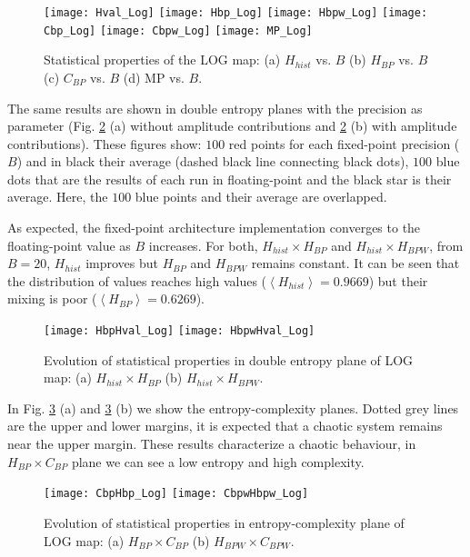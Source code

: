 \begin{figure}
	\texttt{[image: Hval\_Log]}
	\texttt{[image: Hbp\_Log]}
	\texttt{[image: Hbpw\_Log]}
	\texttt{[image: Cbp\_Log]}
	\texttt{[image: Cbpw\_Log]}
	\texttt{[image: MP\_Log]}
	\caption{Statistical properties of the LOG map: (a) $H_{hist}$ vs. $B$ (b) $H_{BP}$ vs. $B$ (c) $C_{BP}$ vs. $B$ (d) MP vs. $B$.}
	\label{fig:LOG_QuantiB}
\end{figure}

The same results are shown in double entropy planes with the precision as parameter (Fig. \ref{fig:LOG_HH} (a) without amplitude contributions and \ref{fig:LOG_HH} (b) with amplitude contributions).
These figures show: $100$ red points for each fixed-point precision ($B$) and in black their average (dashed black line connecting black dots), $100$ blue dots that are the results of each run in floating-point and the black star is their average.
Here, the $100$ blue points and their average are overlapped.

As expected, the fixed-point architecture implementation converges to the floating-point value as $B$ increases.
For both, $H_{hist} \times H_{BP}$ and $H_{hist} \times H_{BPW}$, from $B=20$, $H_{hist}$ improves but $H_{BP}$ and $H_{BPW}$ remains constant.
It can be seen that the distribution of values reaches high values ($\left\langle H_{hist}\right\rangle =0.9669$) but their mixing is poor ($\left\langle H_{BP}\right\rangle =0.6269$).

\begin{figure}
	\texttt{[image: HbpHval\_Log]}
	\texttt{[image: HbpwHval\_Log]}
	\caption{Evolution of statistical properties in double entropy plane of LOG map: (a) $H_{hist} \times H_{BP}$ (b) $H_{hist} \times H_{BPW}$.}
	\label{fig:LOG_HH}
\end{figure}

In Fig. \ref{fig:LOG_HC} (a) and \ref{fig:LOG_HC} (b) we show the entropy-complexity planes.
Dotted grey lines are the upper and lower margins, it is expected that a chaotic system remains near the upper margin.
These results characterize a chaotic behaviour, in $H_{BP} \times C_{BP}$ plane we can see a low entropy and high complexity.

\begin{figure}
	\texttt{[image: CbpHbp\_Log]}
	\texttt{[image: CbpwHbpw\_Log]}
	\caption{Evolution of statistical properties in entropy-complexity plane of LOG map: (a) $H_{BP} \times C_{BP}$ (b) $H_{BPW} \times C_{BPW}$.}
	\label{fig:LOG_HC}
\end{figure}

